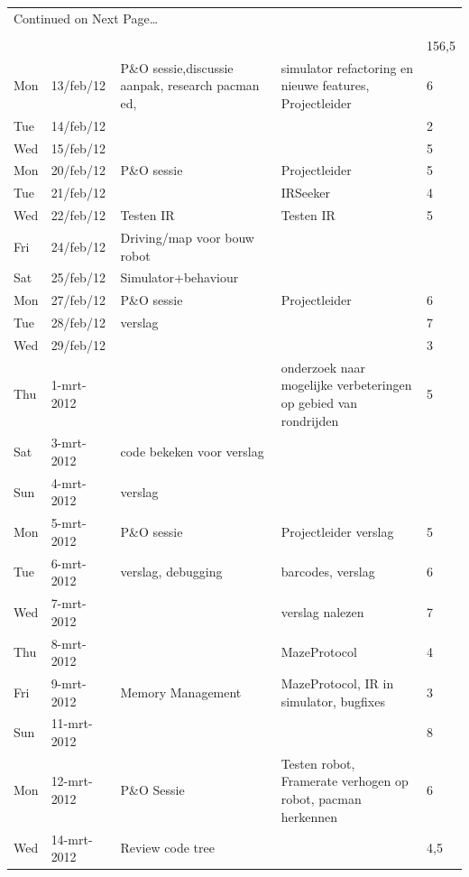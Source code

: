 \documentclass[12pt,a4paper]{report}
\begin{document}
\begin{landscape}
\begin{longtable}{llp{7cm}p{10cm}l}
\multicolumn{5}{l}{{Continued on Next Page\ldots}} \\
\endfoot

\\[-1.8ex] \hline \hline
\endlastfoot

\hline
 &  &  &  & 156,5 \\ 
\hline
Mon & 13/feb/12 & P\&O sessie,discussie aanpak, research pacman ed,  & simulator refactoring en nieuwe features, Projectleider & 6 \\ 
\hline
Tue & 14/feb/12 &  &  & 2 \\ 
\hline
Wed & 15/feb/12 &  &  & 5 \\ 
\hline
Mon & 20/feb/12 & P\&O sessie & Projectleider & 5 \\ 
\hline
Tue & 21/feb/12 &  & IRSeeker & 4 \\ 
\hline
Wed & 22/feb/12 & Testen IR & Testen IR & 5 \\ 
\hline
Fri & 24/feb/12 & Driving/map voor bouw robot &  &  \\ 
\hline
Sat & 25/feb/12 & Simulator+behaviour &  &  \\ 
\hline
Mon & 27/feb/12 & P\&O sessie & Projectleider & 6 \\ 
\hline
Tue & 28/feb/12 & verslag &  & 7 \\ 
\hline
Wed & 29/feb/12 &  &  & 3 \\ 
\hline
Thu & 1-mrt-2012 &  & onderzoek naar mogelijke verbeteringen op gebied van rondrijden & 5 \\ 
\hline
Sat & 3-mrt-2012 & code bekeken voor verslag &  &  \\ 
\hline
Sun & 4-mrt-2012 & verslag &  &  \\ 
\hline
Mon & 5-mrt-2012 & P\&O sessie & Projectleider verslag & 5 \\ 
\hline
Tue & 6-mrt-2012 & verslag, debugging & barcodes, verslag & 6 \\ 
\hline
Wed & 7-mrt-2012 &  & verslag nalezen & 7 \\ 
\hline
Thu & 8-mrt-2012 &  & MazeProtocol & 4 \\ 
\hline
Fri & 9-mrt-2012 & Memory Management & MazeProtocol, IR in simulator, bugfixes & 3 \\ 
\hline
Sun & 11-mrt-2012 &  &  & 8 \\ 
\hline
Mon & 12-mrt-2012 & P\&O Sessie & Testen robot, Framerate verhogen op robot, pacman herkennen & 6 \\ 
\hline
Wed & 14-mrt-2012 & Review code tree  &  & 4,5 \\ 

\end{longtable}
\end{landscape}
\end{document}
